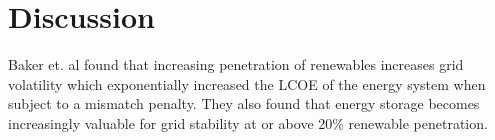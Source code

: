 \section{Discussion}


Baker et. al found that increasing penetration of renewables increases grid
volatility which exponentially increased the \gls{LCOE} of the energy system when
subject to a mismatch penalty. They also found that energy storage becomes
increasingly valuable for grid stability at or above 20\% renewable
penetration.
